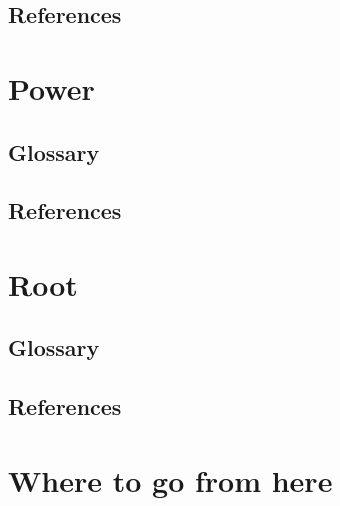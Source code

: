 \documentclass[12pt]{book}
\begin{document}
\section{References}
\newpage

\chapter{Power}%
\section{Glossary}
\section{References}
\newpage

\chapter{Root}%
\section{Glossary}
\section{References}
\newpage

\chapter{Where to go from here}
\newpage

\backmatter
\printindex
\end{document}
